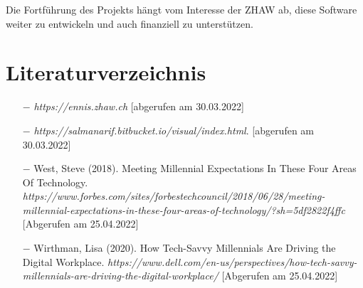 \documentclass[10pt]{article}
\begin{document}
Die Fortführung des Projekts hängt vom Interesse der ZHAW ab, diese Software weiter zu entwickeln und auch finanziell zu unterstützen.

\section{Literaturverzeichnis}

\begin{itemize}

\item[$-$] \emph{https://ennis.zhaw.ch} [abgerufen am 30.03.2022]
\item[$-$] \emph{https://salmanarif.bitbucket.io/visual/index.html}. [abgerufen am 30.03.2022]
\item[$-$] West, Steve (2018). Meeting Millennial Expectations In These Four Areas Of Technology. \emph{https://www.forbes.com/sites/forbestechcouncil/2018/06/28/meeting-millennial-expectations-in-these-four-areas-of-technology/?sh=5df2822f4ffc} [Abgerufen am 25.04.2022]
\item[$-$] Wirthman, Lisa (2020). How Tech-Savvy Millennials Are Driving the Digital Workplace. \emph{https://www.dell.com/en-us/perspectives/how-tech-savvy-millennials-are-driving-the-digital-workplace/} [Abgerufen am 25.04.2022]

\end{itemize}
\end{document}
